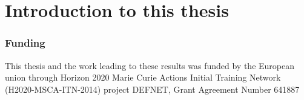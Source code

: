 
\graphicspath{ {\thisch/figures/} }

\chapter{Introduction to this thesis}%
\label{intro}

\subsection*{Funding}

This thesis and the work leading to these results 
was funded by the European union through Horizon 2020 Marie Curie
Actions Initial Training Network (H2020-MSCA-ITN-2014)
project DEFNET, Grant Agreement Number 641887